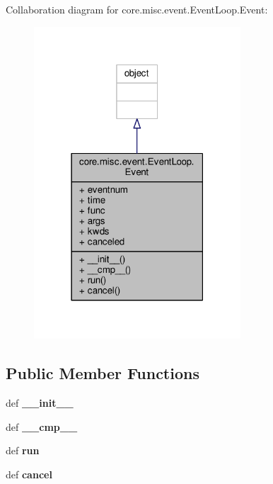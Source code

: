 Collaboration diagram for core.\+misc.\+event.\+Event\+Loop.\+Event\+:
\nopagebreak
\begin{figure}[H]
\begin{center}
\leavevmode
\includegraphics[width=219pt]{classcore_1_1misc_1_1event_1_1_event_loop_1_1_event__coll__graph}
\end{center}
\end{figure}
\subsection*{Public Member Functions}
\begin{DoxyCompactItemize}
\item 
\hypertarget{classcore_1_1misc_1_1event_1_1_event_loop_1_1_event_a9e6e237d411c5098d99be8c123a2e7a2}{def {\bfseries \+\_\+\+\_\+init\+\_\+\+\_\+}}\label{classcore_1_1misc_1_1event_1_1_event_loop_1_1_event_a9e6e237d411c5098d99be8c123a2e7a2}

\item 
\hypertarget{classcore_1_1misc_1_1event_1_1_event_loop_1_1_event_afc52908561ab68200fc76ec73cd36afd}{def {\bfseries \+\_\+\+\_\+cmp\+\_\+\+\_\+}}\label{classcore_1_1misc_1_1event_1_1_event_loop_1_1_event_afc52908561ab68200fc76ec73cd36afd}

\item 
\hypertarget{classcore_1_1misc_1_1event_1_1_event_loop_1_1_event_a904326102cbe8d45613254963241719e}{def {\bfseries run}}\label{classcore_1_1misc_1_1event_1_1_event_loop_1_1_event_a904326102cbe8d45613254963241719e}

\item 
\hypertarget{classcore_1_1misc_1_1event_1_1_event_loop_1_1_event_ae09fe16e5208cf857fc7ccd61934a2dd}{def {\bfseries cancel}}\label{classcore_1_1misc_1_1event_1_1_event_loop_1_1_event_ae09fe16e5208cf857fc7ccd61934a2dd}

\end{DoxyCompactItemize}
